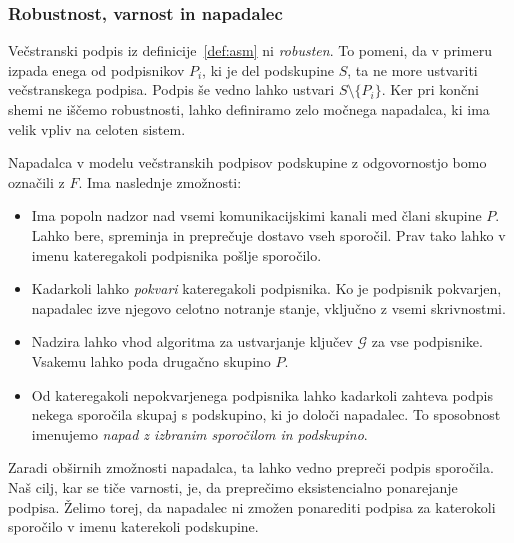 \documentclass[isrm2, tisk]{fmfdelo}
\begin{document}
\subsubsection{Robustnost, varnost in napadalec}
Večstranski podpis iz definicije~\ref{def:asm} ni \textit{robusten}. To pomeni, da v primeru izpada
enega od podpisnikov $P_i$, ki je del podskupine $S$, ta ne more ustvariti večstranskega podpisa.
Podpis še vedno lahko ustvari $S \setminus \{P_i\}$. Ker pri končni shemi ne iščemo robustnosti,
lahko definiramo zelo močnega napadalca, ki ima velik vpliv na celoten sistem.
\begin{definicija}
\label{def:asm-napadalec}
    Napadalca v modelu večstranskih podpisov podskupine z odgovornostjo bomo označili z $F$. Ima
    naslednje zmožnosti:
    \begin{itemize}
        \item Ima popoln nadzor nad vsemi komunikacijskimi kanali med člani skupine $P$. Lahko bere,
            spreminja in preprečuje dostavo vseh sporočil. Prav tako lahko v imenu kateregakoli
            podpisnika pošlje sporočilo.
        \item Kadarkoli lahko \textit{pokvari} kateregakoli podpisnika. Ko je podpisnik pokvarjen,
            napadalec izve njegovo celotno notranje stanje, vključno z vsemi skrivnostmi.
        \item Nadzira lahko vhod algoritma za ustvarjanje ključev $\mathcal{G}$ za vse podpisnike.
            Vsakemu lahko poda drugačno skupino $P$.
        \item Od kateregakoli nepokvarjenega podpisnika lahko kadarkoli zahteva podpis nekega sporočila
            skupaj s podskupino, ki jo določi napadalec. To sposobnost imenujemo
            \textit{napad z izbranim sporočilom in podskupino}.
    \end{itemize}
\end{definicija}

Zaradi obširnih zmožnosti napadalca, ta lahko vedno prepreči podpis sporočila. Naš cilj, kar se
tiče varnosti, je, da preprečimo eksistencialno ponarejanje podpisa. Želimo torej, da napadalec ni
zmožen ponarediti podpisa za katerokoli sporočilo v imenu katerekoli podskupine.
\end{document}
